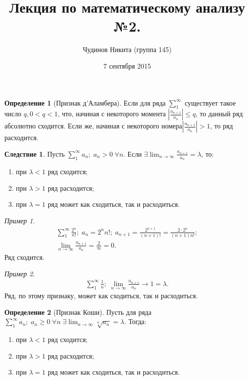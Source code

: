 \documentclass[a4paper,12pt]{article}
\theoremstyle{remark}
\newtheorem*{example}{Пример}
\theoremstyle{definition}
\newtheorem{definition}{Определение}
\newtheorem*{effect}{Следствие}
\begin{document}
\sloppy
\author{Чудинов Никита (группа 145)}
\date{7 сентября 2015}
\title{\vspace{-2.0cm}Лекция по математическому анализу №2.}
\frenchspacing
 
\maketitle


\begin{definition}[Признак д'Аламбера]
	Если для ряда \(\sum_{1}^{\infty}\) существует такое число \(q, {0 < q < 1}\), что, начиная с некоторого момента \(\left| \frac{a_{n+1}}{a_n}\right| \leqslant q \), то данный ряд абсолютно сходится. Если же, начиная с некоторого номера\(\left| \frac{a_{n+1}}{a_n}\right| > 1\), то ряд расходится.
\end{definition}

\begin{effect}
	Пусть \(\sum_{1}^{\infty} a_n;\; a_n > 0 \;\forall n\).
	Если \(\exists \lim_{n \rightarrow \infty} \frac{a_{n+1}}{a_n} = \lambda\), то:
	\begin{enumerate}
		\item при \(\lambda < 1\) ряд сходится;
		\item при \(\lambda > 1\) ряд расходится;
		\item при \(\lambda = 1\) ряд может как сходиться, так и расходиться.
	\end{enumerate}
\end{effect}

\begin{example}
	\begin{gather*}
		\sum_1^\infty \frac{2^n}{n!};\; a_n = {2^n}{n!};\; a_{n+1} = \frac{2^{n+1}}{(n + 1)!} = \frac{2 \cdot 2^n}{(n + 1)n!}; \\
		\lim_{n \rightarrow \infty} \frac{a_{n+1}}{a_n} = \frac{2}{\infty} = 0.
	\end{gather*}
	Ряд сходится.
\end{example}

\begin{example}
	\begin{gather*}
		\sum_1^\infty \frac{1}{n};\; \lim_{n \rightarrow \infty} \frac{a_{n+1}}{a_n} \rightarrow 1 = \lambda.
	\end{gather*}
	Ряд, по этому признаку, может как сходиться, так и расходиться.
\end{example}

\begin{definition}[Признак Коши]
	Пусть для ряда \(\sum_1^{\infty} a_n;\; a_n \geqslant 0 \;\forall n \;\exists \lim_{n \rightarrow \infty} \sqrt[n]{a_n} = \lambda\).
	Тогда:
	\begin{enumerate}
		\item при \(\lambda < 1\) ряд сходится;
		\item при \(\lambda > 1\) ряд расходится;
		\item при \(\lambda = 1\) ряд может как сходиться, так и расходиться.
	\end{enumerate}
\end{definition}
\end{document}
